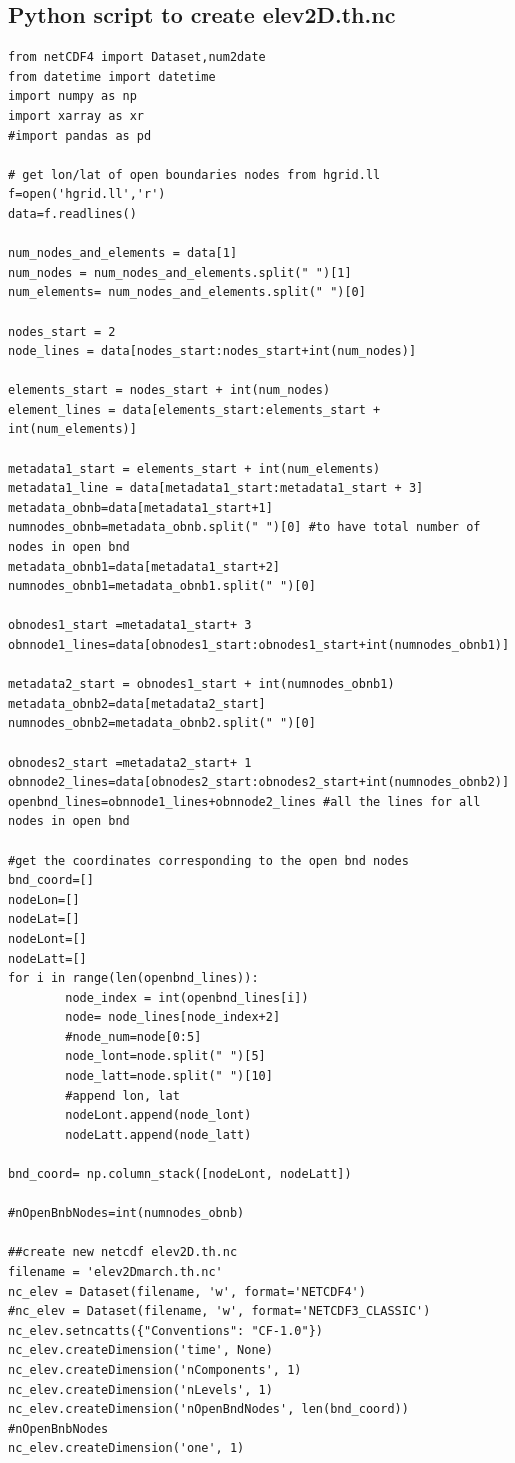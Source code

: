 \documentclass[preprints,briefreport,accept,oneauthor,pdftex]{Definitions/mdpi}
\begin{document}
\subsection{Python script to create elev2D.th.nc}
\begin{verbatim}
from netCDF4 import Dataset,num2date
from datetime import datetime
import numpy as np
import xarray as xr
#import pandas as pd

# get lon/lat of open boundaries nodes from hgrid.ll
f=open('hgrid.ll','r')
data=f.readlines()

num_nodes_and_elements = data[1]
num_nodes = num_nodes_and_elements.split(" ")[1]
num_elements= num_nodes_and_elements.split(" ")[0]

nodes_start = 2
node_lines = data[nodes_start:nodes_start+int(num_nodes)]

elements_start = nodes_start + int(num_nodes) 
element_lines = data[elements_start:elements_start + int(num_elements)]

metadata1_start = elements_start + int(num_elements) 
metadata1_line = data[metadata1_start:metadata1_start + 3]
metadata_obnb=data[metadata1_start+1]
numnodes_obnb=metadata_obnb.split(" ")[0] #to have total number of nodes in open bnd
metadata_obnb1=data[metadata1_start+2]
numnodes_obnb1=metadata_obnb1.split(" ")[0] 

obnodes1_start =metadata1_start+ 3
obnnode1_lines=data[obnodes1_start:obnodes1_start+int(numnodes_obnb1)]

metadata2_start = obnodes1_start + int(numnodes_obnb1)
metadata_obnb2=data[metadata2_start]
numnodes_obnb2=metadata_obnb2.split(" ")[0]

obnodes2_start =metadata2_start+ 1
obnnode2_lines=data[obnodes2_start:obnodes2_start+int(numnodes_obnb2)]
openbnd_lines=obnnode1_lines+obnnode2_lines #all the lines for all nodes in open bnd

#get the coordinates corresponding to the open bnd nodes
bnd_coord=[]
nodeLon=[]
nodeLat=[]
nodeLont=[]
nodeLatt=[]
for i in range(len(openbnd_lines)):
        node_index = int(openbnd_lines[i])
        node= node_lines[node_index+2]
        #node_num=node[0:5]
        node_lont=node.split(" ")[5]
        node_latt=node.split(" ")[10]
        #append lon, lat
        nodeLont.append(node_lont)
        nodeLatt.append(node_latt)

bnd_coord= np.column_stack([nodeLont, nodeLatt])

#nOpenBnbNodes=int(numnodes_obnb)

##create new netcdf elev2D.th.nc
filename = 'elev2Dmarch.th.nc'
nc_elev = Dataset(filename, 'w', format='NETCDF4')
#nc_elev = Dataset(filename, 'w', format='NETCDF3_CLASSIC')
nc_elev.setncatts({"Conventions": "CF-1.0"})
nc_elev.createDimension('time', None)
nc_elev.createDimension('nComponents', 1) 
nc_elev.createDimension('nLevels', 1) 
nc_elev.createDimension('nOpenBndNodes', len(bnd_coord)) #nOpenBnbNodes
nc_elev.createDimension('one', 1) 


\end{verbatim}
\end{document}
